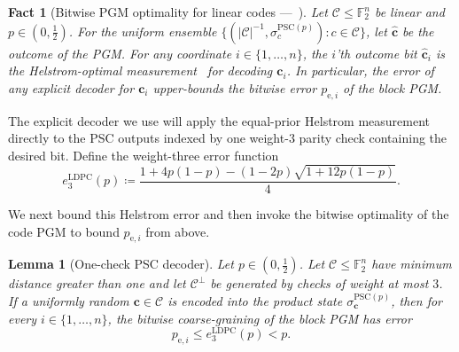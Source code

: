 \documentclass[11pt]{article}
\renewcommand{\leq}{\leqslant}
\newtheorem{fact}[fact]{Fact}
\newtheorem{lemma}[lemma]{Lemma}
\theoremstyle{remark}
\newcommand{\cC}{\mathcal{C}}
\newcommand{\F}{\mathbb{F}}
\newcommand{\bchat}{\hat{\mathbf{c}}}
\newcommand{\bc}{\mathbf{c}}
\newcommand{\abs}[1]{\left|#1\right|}
\newcommand{\PSC}{\mathrm{PSC}}
\begin{document}
\begin{fact}[{Bitwise PGM optimality for linear codes ---~\cite[Proposition~5.1]{PR25}}]
\label{fact:psc-bitwise-optimal}
Let $\cC \leq \F_2^n$ be linear and $p \in (0,\frac{1}{2})$. For the uniform ensemble $\{(\abs{\cC}^{-1},\sigma_c^{\PSC(p)}) : c \in \cC\}$, let $\bchat$ be the outcome of the PGM. For any coordinate $i \in \{1, \ldots , n\}$, the $i$'th outcome bit $\bchat_i$ is the Helstrom-optimal measurement~\cite{Hel69} for decoding $\bc_i$. In particular, the error of any explicit decoder for $\bc_i$ upper-bounds the bitwise error $p_{\mathrm{e},i}$ of the block PGM.
\end{fact}

The explicit decoder we use will apply the equal-prior Helstrom measurement directly to the PSC outputs indexed by one weight-$3$ parity check containing the desired bit. Define the weight-three error function
\begin{equation}
\label{eq:ldpc-local-error}
e_3^{\mathrm{LDPC}}(p)
\coloneqq
\frac{1+4p(1-p)-(1-2p)\sqrt{1+12p(1-p)}}{4}.
\end{equation}

We next bound this Helstrom error and then invoke the bitwise optimality of the code PGM to bound $p_{\mathrm{e},i}$ from above.

\begin{lemma}[One-check PSC decoder]
\label{lem:psc-local-check}
Let $p \in (0,\frac{1}{2})$. Let $\cC \leq \F_2^n$ have minimum distance greater than one and let $\cC^\perp$ be generated by checks of weight at most $3$. If a uniformly random $\bc \in \cC$ is encoded into the product state $\sigma_{\bc}^{\PSC(p)}$, then for every $i \in \{1, \ldots , n\}$, the bitwise coarse-graining of the block PGM has error
\begin{equation*}
p_{\mathrm{e},i}
\leq e_3^{\mathrm{LDPC}}(p)
< p.
\end{equation*}
\end{lemma}
\end{document}
